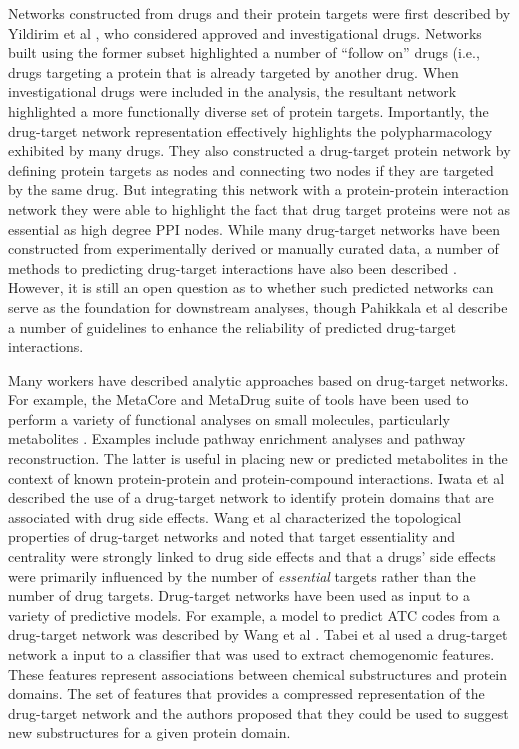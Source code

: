 \documentclass[]{book}
\begin{document}
Networks constructed from drugs and their protein targets were first
described by Yildirim et al \cite{Yildirim:2007aa}, who considered
approved and investigational drugs. Networks built using the former
subset highlighted a number of ``follow on'' drugs (i.e., drugs
targeting a protein that is already targeted by another drug. When
investigational drugs were included in the analysis, the resultant
network highlighted a more functionally diverse set of protein
targets. Importantly, the drug-target network representation
effectively highlights the polypharmacology exhibited by many
drugs. They also constructed a drug-target protein network by defining
protein targets as nodes and connecting two nodes if they are targeted
by the same drug. But integrating this network with a protein-protein
interaction network they were able to highlight the fact that drug
target proteins were not as essential \cite{Jeong:2001gd} as high
degree PPI nodes. While many drug-target networks have been
constructed from experimentally derived or manually curated data, a
number of methods to predicting drug-target interactions have also
been described
\cite{Alaimo:2013ev,Wang:2013mw,Heiskanen:2013rc}. However, it is
still an open question as to whether such predicted networks can serve
as the foundation for downstream analyses, though Pahikkala et al
\cite{Pahikkala:2014gt} describe a number of guidelines to enhance the
reliability of predicted drug-target interactions.

Many workers have described analytic approaches based on drug-target
networks. For example, the MetaCore and MetaDrug suite of tools have
been used to perform a variety of functional analyses on small
molecules, particularly metabolites \cite{Brennan:2009kx}.  Examples
include pathway enrichment analyses and pathway reconstruction. The
latter is useful in placing new or predicted metabolites in the
context of known protein-protein and protein-compound
interactions. Iwata et al \cite{Iwata:2013lk} described the use of a
drug-target network to identify protein domains that are associated
with drug side effects. Wang et al \cite{Wang:2013gn} characterized
the topological properties of drug-target networks and noted that
target essentiality and centrality were strongly linked to drug side
effects and that a drugs' side effects were primarily influenced by
the number of \emph{essential} targets rather than the number of drug
targets. Drug-target networks have been used as input to a variety of
predictive models. For example, a model to predict ATC codes from a
drug-target network was described by Wang et al
\cite{Wang:2013ye}. Tabei et al \cite{Tabei:2012tn} used a drug-target
network a input to a classifier that was used to extract chemogenomic
features. These features represent associations between chemical
substructures and protein domains. The set of features that provides a
compressed representation of the drug-target network and the authors
proposed that they could be used to suggest new substructures for a
given protein domain.
\end{document}
